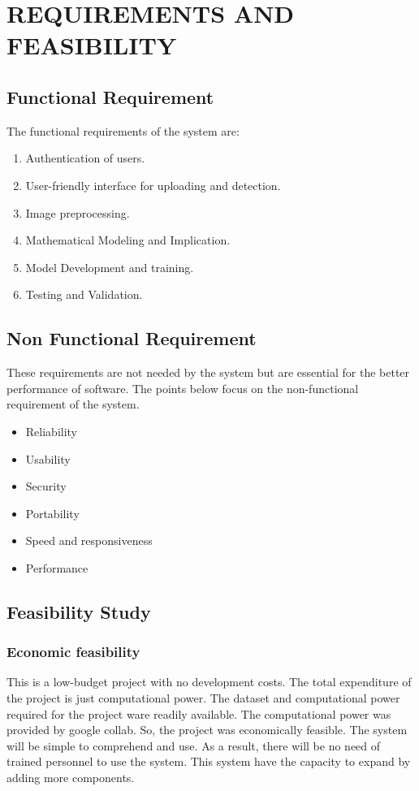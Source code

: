 
\section{REQUIREMENTS AND FEASIBILITY }

\subsection{Functional Requirement}
The functional requirements of the system are:
\begin{enumerate}
    \item Authentication of users.
    \item User-friendly interface for uploading and detection.
    \item Image preprocessing.
    \item Mathematical Modeling and Implication. 
    \item Model Development and training.
    \item Testing and Validation.

\end{enumerate}

\subsection{Non Functional Requirement}
\justify
These requirements are not needed by the system but are essential for the better
performance of software. The points below focus on the non-functional requirement of
the system.
\begin{itemize}
    \item Reliability
    \item   Usability
    \item   Security
    \item   Portability
    \item   Speed and responsiveness
    \item  Performance
\end{itemize}
\newpage
\subsection{Feasibility Study}

\subsubsection{Economic feasibility}
This is a low-budget project with no development costs. The total expenditure of the
project is just computational power. The dataset and computational power required for
the project ware readily available. The computational power was provided by google
collab. So, the project was economically feasible. The system will be simple to
comprehend and use. As a result, there will be no need of trained personnel to use the
system. This system have the capacity to expand by adding more components.

